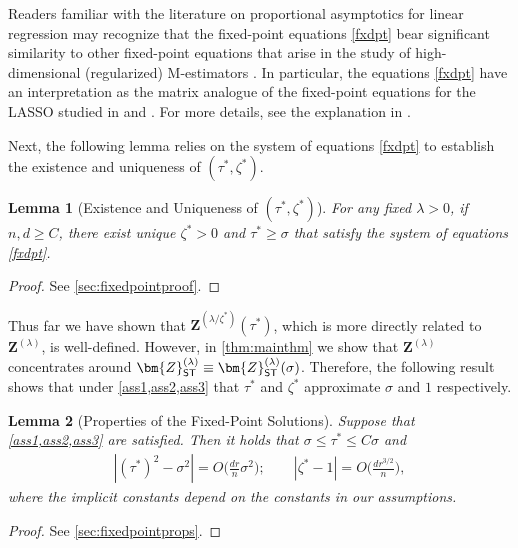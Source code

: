 \documentclass[10pt]{article}
\newcommand{\s}{^*}
\newtheorem{lemma}{Lemma}
\theoremstyle{definition}
\begin{document}
Readers familiar with the literature on proportional asymptotics for linear regression may recognize that the fixed-point equations \eqref{fxdpt} bear significant similarity to other fixed-point equations that arise in the study of high-dimensional (regularized) M-estimators \citep{bellec_existence_2024,donoho_high_2016,el_karoui_robust_2013,koriyama_phase_2025,berthier_state_2020}.  In particular, the equations \eqref{fxdpt} have an interpretation as the matrix analogue of the fixed-point equations for the LASSO studied in \citet{celentano_lasso_2023} and \citet{miolane_distribution_2021}.  For more details, see the explanation in \citet{celentano_lasso_2023}.  

Next, the following lemma relies on the system of equations \eqref{fxdpt} to establish the existence and uniqueness of $(\tau\s,\zeta\s)$.
\begin{lemma}[Existence and Uniqueness of $(\tau\s,\zeta\s)$] \label{prop:fxdpt} For any fixed $\lambda >0$, if $n,d \geq C$, there exist unique $\zeta\s > 0 $ and $\tau\s \geq \sigma$ that satisfy the system of equations \eqref{fxdpt}. 
\end{lemma}

\begin{proof}
    See \cref{sec:fixedpointproof}.
\end{proof}


Thus far we have shown that $\bm{Z}^{(\lambda/\zeta\s)}(\tau\s)$, which is more directly related to $\bm{Z}^{(\lambda)}$, is well-defined.  However, in \cref{thm:mainthm} we show that $\bm{Z}^{(\lambda)}$ concentrates around $\bm{Z}^{(\lambda)}_{{\sf ST}} \equiv \bm{Z}^{(\lambda)}_{{\sf ST}}(\sigma)$.  Therefore, the following result shows that under \cref{ass1,ass2,ass3} that $\tau\s$ and $\zeta\s$ approximate $\sigma$ and $1$ respectively.


\begin{lemma}[Properties of the Fixed-Point Solutions]\label{lem:fxdpointprops}
Suppose that \cref{ass1,ass2,ass3} are satisfied.  Then it holds that $\sigma \leq \tau\s \leq C \sigma$ and 
\begin{align}
    |(\tau\s)^2 - \sigma^2 | =O\bigg( \frac{d r}{n} \sigma^2 \bigg); \qquad |\zeta\s - 1 | = O\bigg( \frac{d r^{3/2}}{n} \bigg),
\end{align}
where the implicit constants depend on the constants in our assumptions.  
\end{lemma}
\begin{proof}
    See \cref{sec:fixedpointprops}.
\end{proof}
\end{document}
